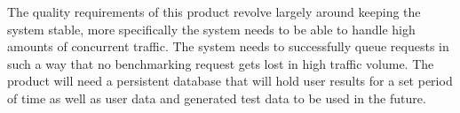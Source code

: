 The quality requirements of this product revolve largely around keeping the 
system stable, more specifically the system needs to be able to handle high
amounts of concurrent traffic. The system needs to successfully queue requests
in such a way that no benchmarking request gets lost in high traffic volume. The
product will need a persistent database that will hold user results for a set 
period of time as well as user data and generated test data to be used in the 
future. 